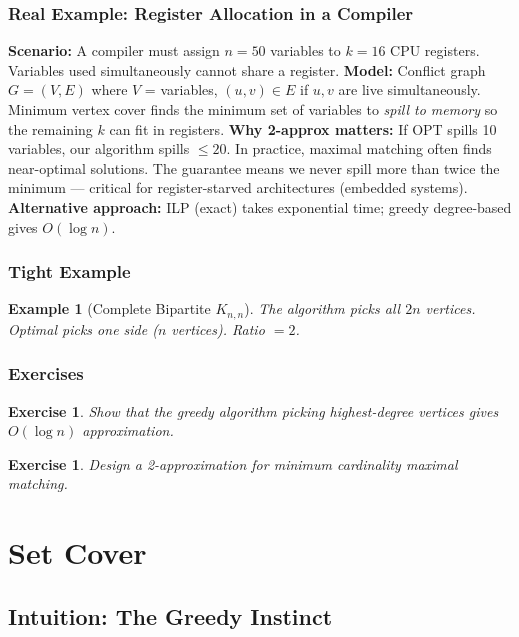 \documentclass[11pt,oneside]{book}
\newtheorem{example}[theorem]{Example}
\newtheorem{exercise}[theorem]{Exercise}
\begin{document}
\subsection*{Real Example: Register Allocation in a Compiler}
\textbf{Scenario:} A compiler must assign $n=50$ variables to $k=16$ CPU registers. Variables used simultaneously cannot share a register.
\textbf{Model:} Conflict graph $G=(V,E)$ where $V$ = variables, $(u,v) \in E$ if $u,v$ are live simultaneously. Minimum vertex cover finds the minimum set of variables to \emph{spill to memory} so the remaining $k$ can fit in registers.
\textbf{Why 2-approx matters:} If OPT spills 10 variables, our algorithm spills $\leq 20$. In practice, maximal matching often finds near-optimal solutions. The guarantee means we never spill more than twice the minimum — critical for register-starved architectures (embedded systems).
\textbf{Alternative approach:} ILP (exact) takes exponential time; greedy degree-based gives $O(\log n)$.

\subsection{Tight Example}

\begin{example}[Complete Bipartite $K_{n,n}$]
The algorithm picks all $2n$ vertices. Optimal picks one side ($n$ vertices). Ratio $= 2$.
\end{example}

\subsection{Exercises}
\begin{exercise}
Show that the greedy algorithm picking highest-degree vertices gives $O(\log n)$ approximation.
\end{exercise}
\begin{exercise}
Design a 2-approximation for \emph{minimum cardinality maximal matching}.
\end{exercise}

\setcounter{chapter}{1}
\chapter{Set Cover}
\label{ch:setcover}

\section{Intuition: The Greedy Instinct}
\end{document}
